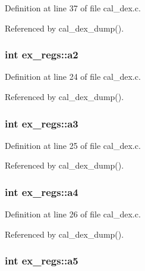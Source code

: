 Definition at line 37 of file cal\+\_\+dex.\+c.



Referenced by cal\+\_\+dex\+\_\+dump().

\subsubsection[{\texorpdfstring{a2}{a2}}]{\setlength{\rightskip}{0pt plus 5cm}int ex\+\_\+regs\+::a2}\hypertarget{structex__regs_a26e59e49025e70d6d9aaaf96a3f4df53}{}\label{structex__regs_a26e59e49025e70d6d9aaaf96a3f4df53}


Definition at line 24 of file cal\+\_\+dex.\+c.



Referenced by cal\+\_\+dex\+\_\+dump().

\subsubsection[{\texorpdfstring{a3}{a3}}]{\setlength{\rightskip}{0pt plus 5cm}int ex\+\_\+regs\+::a3}\hypertarget{structex__regs_ab71b2779966288ee152a7b7ca30241f2}{}\label{structex__regs_ab71b2779966288ee152a7b7ca30241f2}


Definition at line 25 of file cal\+\_\+dex.\+c.



Referenced by cal\+\_\+dex\+\_\+dump().

\subsubsection[{\texorpdfstring{a4}{a4}}]{\setlength{\rightskip}{0pt plus 5cm}int ex\+\_\+regs\+::a4}\hypertarget{structex__regs_aa2b0ed69fb75ee2b8384b5b975737c64}{}\label{structex__regs_aa2b0ed69fb75ee2b8384b5b975737c64}


Definition at line 26 of file cal\+\_\+dex.\+c.



Referenced by cal\+\_\+dex\+\_\+dump().

\subsubsection[{\texorpdfstring{a5}{a5}}]{\setlength{\rightskip}{0pt plus 5cm}int ex\+\_\+regs\+::a5}\hypertarget{structex__regs_a8d6ecd5647dd5921c86b70c3db095d15}{}\label{structex__regs_a8d6ecd5647dd5921c86b70c3db095d15}


